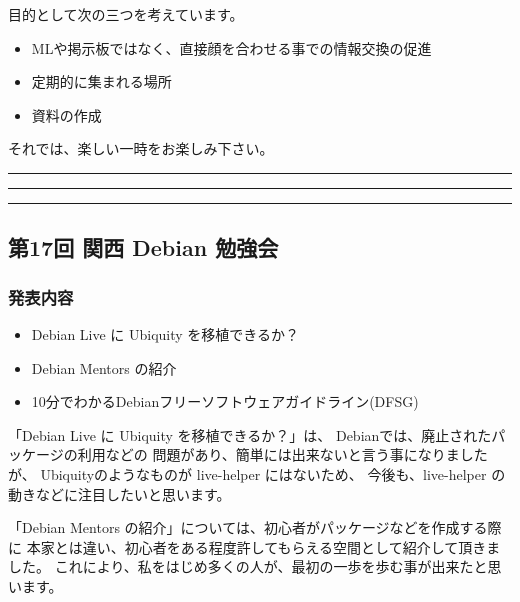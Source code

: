 \documentclass[mingoth,a4paper]{jsarticle}
\begin{document}
 目的として次の三つを考えています。
 \begin{itemize}
  \item MLや掲示板ではなく、直接顔を合わせる事での情報交換の促進
  \item 定期的に集まれる場所
  \item 資料の作成
 \end{itemize}

 それでは、楽しい一時をお楽しみ下さい。

\newpage

\begin{minipage}[b]{0.2\hsize}
 {}
\end{minipage}
\begin{minipage}[b]{0.8\hsize}
\hrule
\vspace{2mm}
\hrule
\setcounter{tocdepth}{1}
\tableofcontents
\vspace{2mm}
\hrule
\end{minipage}


\subsection{第17回 関西 Debian 勉強会}

\subsubsection{発表内容}

\begin{itemize}
 \item Debian Live に Ubiquity を移植できるか？
 \item Debian Mentors の紹介
 \item 10分でわかるDebianフリーソフトウェアガイドライン(DFSG)
\end{itemize}


「Debian Live に Ubiquity を移植できるか？」は、
Debianでは、廃止されたパッケージの利用などの
問題があり、簡単には出来ないと言う事になりましたが、
Ubiquityのようなものが live-helper にはないため、
今後も、live-helper の動きなどに注目したいと思います。

「Debian Mentors の紹介」については、初心者がパッケージなどを作成する際に
本家とは違い、初心者をある程度許してもらえる空間として紹介して頂きました。
これにより、私をはじめ多くの人が、最初の一歩を歩む事が出来たと思います。
\end{document}
